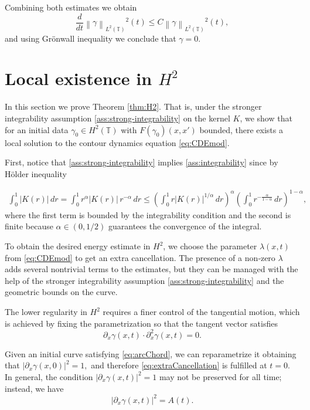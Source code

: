 \documentclass[a4paper]{amsart}
\theoremstyle{definition}
\newcommand{\T}{\ensuremath{\mathbb{T}}}
\newcommand{\Lp}[2][2]{\ensuremath{\left\|#2\right\|_{L^#1(\T)}}}
\begin{document}
    Combining both estimates we obtain $$\frac{d}{dt}\Lp{\gamma}^2(t)\leq C \Lp{\gamma}^2(t),$$ and using Grönwall inequality we conclude that $\gamma=0.$

    
    \section{\texorpdfstring{Local existence in $H^2$}{Local existence in H2}} \label{sec:H2} 
 
    In this section we prove Theorem \ref{thm:H2}. That is, under the stronger integrability assumption \eqref{ass:strong-integrability} on the kernel $K$, we show that for an initial data $\gamma_0\in H^2(\T)$ with $F(\gamma_0)(x,x')$ bounded, there exists a local solution to the contour dynamics equation \eqref{eq:CDEmod}.

    First, notice that \eqref{ass:strong-integrability} implies \ref{ass:integrability} since by Hölder inequality 

    \begin{align*}
        \int_0^1 |K(r)|\,dr
=
\int_0^1 r^\alpha |K(r)|\,r^{-\alpha}\,dr
\le
\left(\int_0^1 r|K(r)|^{1/\alpha}\,dr\right)^\alpha
\left(\int_0^1 r^{-\frac{\alpha}{1-\alpha}}\,dr\right)^{1-\alpha},
    \end{align*}
    where the first term is bounded by the integrability condition and the second is finite because $\alpha\in (0,1/2)$ guarantees the convergence of the integral.

    To obtain the desired energy estimate in $H^2$, we choose the parameter $\lambda(x,t)$ from \eqref{eq:CDEmod} to get an extra cancellation. The presence of a non‑zero $\lambda$ adds several nontrivial terms to the estimates, but they can be managed with the help of the stronger integrability assumption \eqref{ass:strong-integrability} and the geometric bounds on the curve.
    
    The lower regularity in $H^2$ requires a finer control of the tangential motion, which is achieved by fixing the parametrization so that the tangent vector satisfies
    \begin{equation}\label{eq:extraCancellation}
        \partial_x \gamma (x,t)\cdot \partial_x^2 \gamma(x,t) =0.
    \end{equation}

    Given an initial curve satisfying \eqref{eq:arcChord}, we can reparametrize it obtaining that $|\partial_x\gamma(x,0)|^2=1,$ and therefore \eqref{eq:extraCancellation} is fulfilled at $t=0.$ In general, the condition $|\partial_x \gamma(x,t)|^2 = 1$ may not be preserved for all time; instead, we have
    \begin{equation} \label{eq:cancellationTemps}
        |\partial_x\gamma(x,t)|^2=A(t).
    \end{equation}
\end{document}
